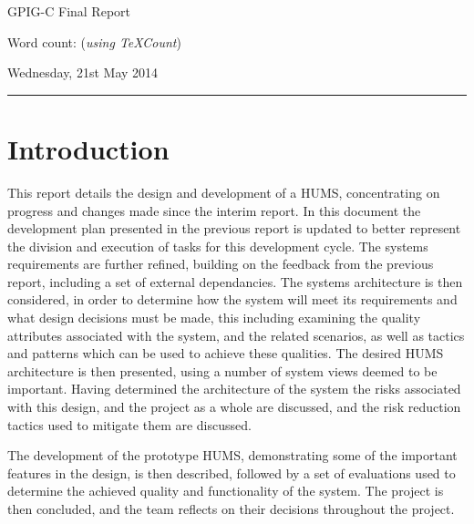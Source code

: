\documentclass[10pt,a4paper]{article}
\begin{document}
\begin{center}
{\Huge GPIG-C Final Report}
\vspace*{0.3cm}

Word count:  (\textit{using TeXCount})
\vspace*{0.3cm}

Wednesday, 21st May 2014
\end{center}
\vspace*{0.4cm}
\hrule
\vspace*{0.4cm}

\section{Introduction}
\label{sec:intro}
This report details the design and development of a HUMS, concentrating on progress and changes made since the interim report. In this document the development plan presented in the previous report is updated to better represent the division and execution of tasks for this development cycle. The systems requirements are further refined, building on the feedback from the previous report, including a set of external dependancies. The systems architecture is then considered, in order to determine how the system will meet its requirements and what design decisions must be made, this including examining the quality attributes associated with the system, and the related scenarios, as well as tactics and patterns which can be used to achieve these qualities. The desired HUMS architecture is then presented, using a number of system views deemed to be important. Having determined the architecture of the system the risks associated with this design, and the project as a whole are discussed, and the risk reduction tactics used to mitigate them are discussed.

The development of the prototype HUMS, demonstrating some of the important features in the design, is then described, followed by a set of evaluations used to determine the achieved quality and functionality of the system. The project is then concluded, and the team reflects on their decisions throughout the project.

\end{document}
